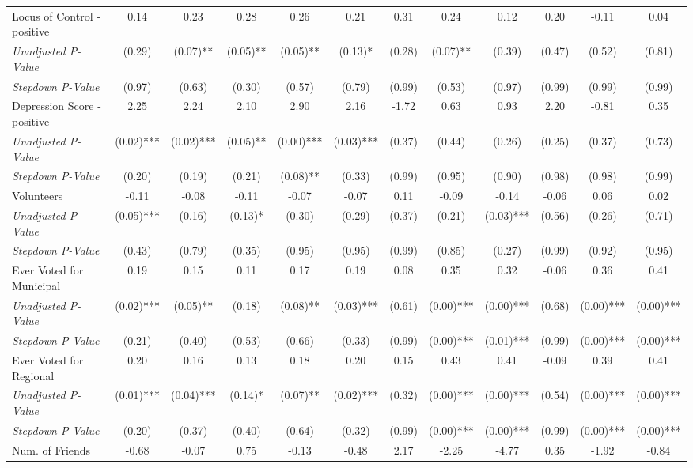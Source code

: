 \begin{tabular}{l c c c c c c c c c c c}
Locus of Control - positive & 0.14 & 0.23 & 0.28 & 0.26 & 0.21 & 0.31 & 0.24 & 0.12 & 0.20 & -0.11 & 0.04 \\
\quad \textit{Unadjusted P-Value} & (0.29) & (0.07)** & (0.05)** & (0.05)** & (0.13)* & (0.28) & (0.07)** & (0.39) & (0.47) & (0.52) & (0.81) \\
\quad \textit{Stepdown P-Value} & (0.97) & (0.63) & (0.30) & (0.57) & (0.79) & (0.99) & (0.53) & (0.97) & (0.99) & (0.99) & (0.99) \\
Depression Score - positive & 2.25 & 2.24 & 2.10 & 2.90 & 2.16 & -1.72 & 0.63 & 0.93 & 2.20 & -0.81 & 0.35 \\
\quad \textit{Unadjusted P-Value} & (0.02)*** & (0.02)*** & (0.05)** & (0.00)*** & (0.03)*** & (0.37) & (0.44) & (0.26) & (0.25) & (0.37) & (0.73) \\
\quad \textit{Stepdown P-Value} & (0.20) & (0.19) & (0.21) & (0.08)** & (0.33) & (0.99) & (0.95) & (0.90) & (0.98) & (0.98) & (0.99) \\
Volunteers & -0.11 & -0.08 & -0.11 & -0.07 & -0.07 & 0.11 & -0.09 & -0.14 & -0.06 & 0.06 & 0.02 \\
\quad \textit{Unadjusted P-Value} & (0.05)*** & (0.16) & (0.13)* & (0.30) & (0.29) & (0.37) & (0.21) & (0.03)*** & (0.56) & (0.26) & (0.71) \\
\quad \textit{Stepdown P-Value} & (0.43) & (0.79) & (0.35) & (0.95) & (0.95) & (0.99) & (0.85) & (0.27) & (0.99) & (0.92) & (0.95) \\
Ever Voted for Municipal & 0.19 & 0.15 & 0.11 & 0.17 & 0.19 & 0.08 & 0.35 & 0.32 & -0.06 & 0.36 & 0.41 \\
\quad \textit{Unadjusted P-Value} & (0.02)*** & (0.05)** & (0.18) & (0.08)** & (0.03)*** & (0.61) & (0.00)*** & (0.00)*** & (0.68) & (0.00)*** & (0.00)*** \\
\quad \textit{Stepdown P-Value} & (0.21) & (0.40) & (0.53) & (0.66) & (0.33) & (0.99) & (0.00)*** & (0.01)*** & (0.99) & (0.00)*** & (0.00)*** \\
Ever Voted for Regional & 0.20 & 0.16 & 0.13 & 0.18 & 0.20 & 0.15 & 0.43 & 0.41 & -0.09 & 0.39 & 0.41 \\
\quad \textit{Unadjusted P-Value} & (0.01)*** & (0.04)*** & (0.14)* & (0.07)** & (0.02)*** & (0.32) & (0.00)*** & (0.00)*** & (0.54) & (0.00)*** & (0.00)*** \\
\quad \textit{Stepdown P-Value} & (0.20) & (0.37) & (0.40) & (0.64) & (0.32) & (0.99) & (0.00)*** & (0.00)*** & (0.99) & (0.00)*** & (0.00)*** \\
Num. of Friends & -0.68 & -0.07 & 0.75 & -0.13 & -0.48 & 2.17 & -2.25 & -4.77 & 0.35 & -1.92 & -0.84 \\

\end{tabular}

